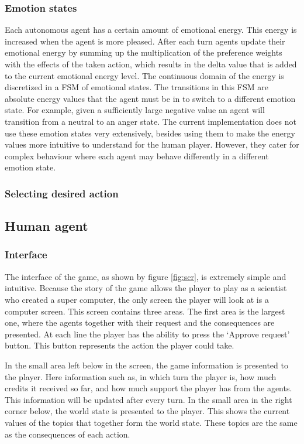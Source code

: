 \documentclass[11pt,a4paper]{article}
\begin{document}
    \subsubsection{Emotion states}
      Each autonomous agent has a certain amount of emotional energy. This energy is increased when the agent is more pleased. After each turn agents update their emotional energy by summing up the multiplication of the preference weights with the effects of the taken action, which results in the delta value that is added to the current emotional energy level. The continuous domain of the energy is discretized in a FSM of emotional states. The transitions in this FSM are absolute energy values that the agent must be in to switch to a different emotion state. For example, given a sufficiently large negative value an agent will transition from a neutral to an anger state. The current implementation does not use these emotion states very extensively, besides using them to make the energy values more intuitive to understand for the human player. However, they cater for complex behaviour where each agent may behave differently in a different emotion state.
    \subsubsection{Selecting desired action}
  \subsection{Human agent}
    \subsubsection{Interface}

The interface of the game, as shown by figure \ref{fig:scr}, is extremely simple and intuitive. Because the story of the game allows the player to play as a scientist who created a super computer, the only screen the player will look at is a computer screen. This screen contains three areas. The first area is the largest one, where the agents together with their request and the consequences are presented. At each line the player has the ability to press the `Approve request' button. This button represents the action the player could take. 

In the small area left below in the screen, the game information is presented to the player. Here information such as, in which turn the player is, how much credits it received so far, and how much support the player has from the agents. This information will be updated after every turn. In the small area in the right corner below, the world state is presented to the player. This shows the current values of the topics that together form the world state. These topics are the same as the consequences of each action. 
\end{document}
